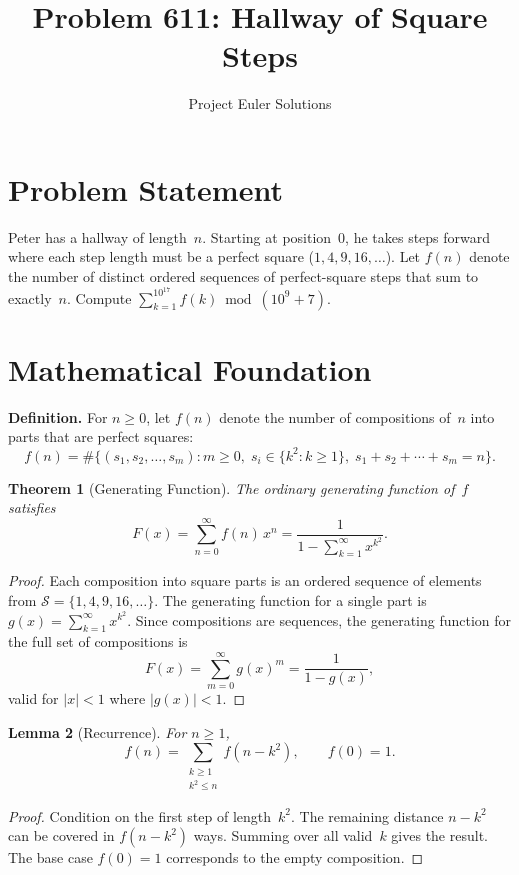 \documentclass[11pt]{article}
\title{Problem 611: Hallway of Square Steps}
\author{Project Euler Solutions}
\date{}
\newtheorem{theorem}{Theorem}
\newtheorem{lemma}[theorem]{Lemma}
\begin{document}
\maketitle

\section{Problem Statement}

Peter has a hallway of length~$n$. Starting at position~$0$, he takes steps forward where each step length must be a perfect square ($1, 4, 9, 16, \ldots$). Let $f(n)$ denote the number of distinct ordered sequences of perfect-square steps that sum to exactly~$n$. Compute $\sum_{k=1}^{10^{17}} f(k) \bmod (10^9 + 7)$.

\section{Mathematical Foundation}

\textbf{Definition.} For $n \ge 0$, let $f(n)$ denote the number of compositions of~$n$ into parts that are perfect squares:
\[
f(n) = \#\bigl\{(s_1, s_2, \ldots, s_m) : m \ge 0,\; s_i \in \{k^2 : k \ge 1\},\; s_1 + s_2 + \cdots + s_m = n\bigr\}.
\]

\begin{theorem}[Generating Function]
The ordinary generating function of~$f$ satisfies
\[
F(x) = \sum_{n=0}^{\infty} f(n)\, x^n = \frac{1}{1 - \sum_{k=1}^{\infty} x^{k^2}}.
\]
\end{theorem}

\begin{proof}
Each composition into square parts is an ordered sequence of elements from $\mathcal{S} = \{1, 4, 9, 16, \ldots\}$. The generating function for a single part is $g(x) = \sum_{k=1}^{\infty} x^{k^2}$. Since compositions are sequences, the generating function for the full set of compositions is
\[
F(x) = \sum_{m=0}^{\infty} g(x)^m = \frac{1}{1 - g(x)},
\]
valid for $|x| < 1$ where $|g(x)| < 1$.
\end{proof}

\begin{lemma}[Recurrence]
For $n \ge 1$,
\[
f(n) = \sum_{\substack{k \ge 1 \\ k^2 \le n}} f(n - k^2), \qquad f(0) = 1.
\]
\end{lemma}

\begin{proof}
Condition on the first step of length~$k^2$. The remaining distance $n - k^2$ can be covered in $f(n - k^2)$ ways. Summing over all valid~$k$ gives the result. The base case $f(0) = 1$ corresponds to the empty composition.
\end{proof}
\end{document}
